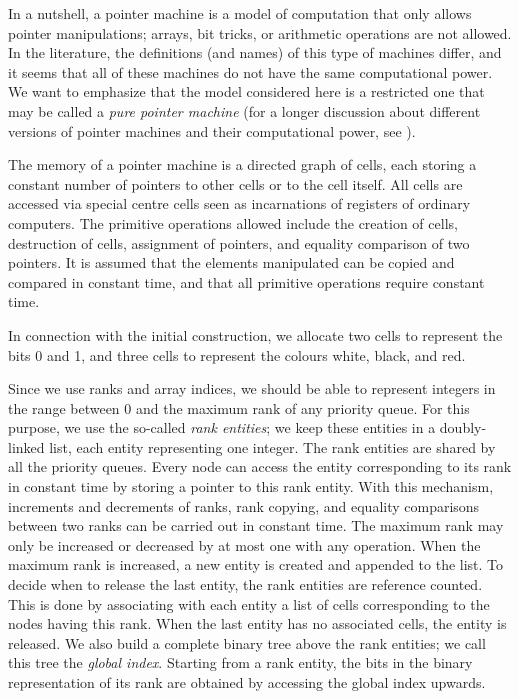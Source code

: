 \documentclass{llncs}
\begin{document}
In a nutshell, a pointer machine is a model of computation that only
allows pointer manipulations; arrays, bit tricks, or arithmetic
operations are not allowed.  In the literature, the definitions (and
names) of this type of machines differ, and it seems that all of these
machines do not have the same computational power. We want to
emphasize that the model considered here is a restricted one that may
be called a \emph{pure pointer machine} (for a longer discussion about
different versions of pointer machines and their computational power,
see \cite{Ben95}).

The memory of a pointer machine is a directed graph of cells, each
storing a constant number of pointers to other cells or to the cell
itself. All cells are accessed via special centre cells seen as
incarnations of registers of ordinary computers. The primitive
operations allowed include the creation of cells, destruction of
cells, assignment of pointers, and equality comparison of two
pointers. It is assumed that the elements manipulated can be copied
and compared in constant time, and that all primitive operations
require constant time.

In connection with the initial construction, we allocate two cells to represent the bits 0 and 1,
and three cells to represent the colours white, black, and red.  

Since we use ranks and array indices, we should be able to represent integers in
the range between 0 and the maximum rank of any priority queue.  
For this purpose, we use the so-called \emph{rank entities}; 
we keep these entities in a doubly-linked list, each entity representing one integer. 
The rank entities are shared by all the priority queues.
Every node can access the entity corresponding to its rank in
constant time by storing a pointer to this rank entity. 
With this mechanism, increments and decrements of ranks, rank copying, and equality
comparisons between two ranks can be carried out in constant time.
The maximum rank may only be increased or decreased by at most one with any operation. 
When the maximum rank is increased, a new entity is created and appended to the list. 
To decide when to release the last entity, the rank
entities are reference counted. This is done by associating with each
entity a list of cells corresponding to the nodes having this rank. 
When the last entity has no associated cells, the entity is released.
We also build a complete binary tree above the rank entities; we call
this tree the \emph{global index}.  Starting from a rank entity, the
bits in the binary representation of its rank are
obtained by accessing the global index upwards.
\end{document}
